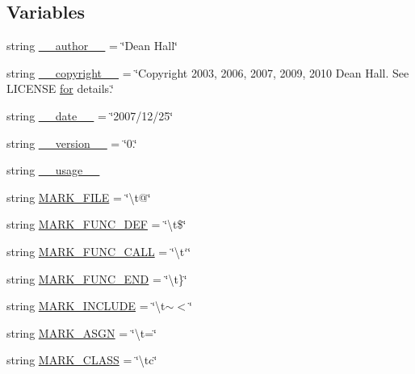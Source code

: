 \subsection*{Variables}
\begin{DoxyCompactItemize}
\item 
string \hyperlink{namespacepycscope_a2298754460411e658bd47ebf789a4cef}{\-\_\-\-\_\-author\-\_\-\-\_\-} = \char`\"{}Dean Hall\char`\"{}
\item 
string \hyperlink{namespacepycscope_aaf595cacaad41fc4a705646cebc1c383}{\-\_\-\-\_\-copyright\-\_\-\-\_\-} = \char`\"{}Copyright 2003, 2006, 2007, 2009, 2010 Dean Hall. See L\-I\-C\-E\-N\-S\-E \hyperlink{group___p_i_o_s___t_i_m_ga354d20ebcb9396fb9b160590fcef9cee}{for} details.\char`\"{}
\item 
string \hyperlink{namespacepycscope_af4accb7da8b3271d0f2ce1d273bbd5de}{\-\_\-\-\_\-date\-\_\-\-\_\-} = \char`\"{}2007/12/25\char`\"{}
\item 
string \hyperlink{namespacepycscope_ad671641244ef639a8ba440baead61e63}{\-\_\-\-\_\-version\-\_\-\-\_\-} = \char`\"{}0.\char`\"{}
\item 
string \hyperlink{namespacepycscope_a5935343cfa1b7b3ed6a6662d8e04f4de}{\-\_\-\-\_\-usage\-\_\-\-\_\-}
\item 
string \hyperlink{namespacepycscope_a009264ba488fb81f5c2faf236dc2957e}{M\-A\-R\-K\-\_\-\-F\-I\-L\-E} = \char`\"{}\textbackslash{}t@\char`\"{}
\item 
string \hyperlink{namespacepycscope_a8ff1f31aa6b2351ef03016d3c8691e90}{M\-A\-R\-K\-\_\-\-F\-U\-N\-C\-\_\-\-D\-E\-F} = \char`\"{}\textbackslash{}t\$\char`\"{}
\item 
string \hyperlink{namespacepycscope_a0ebe5a435fd0cdaa563d5be84886462d}{M\-A\-R\-K\-\_\-\-F\-U\-N\-C\-\_\-\-C\-A\-L\-L} = \char`\"{}\textbackslash{}t`\char`\"{}
\item 
string \hyperlink{namespacepycscope_aca9e6d1a164786d3fe1cd678d995c31f}{M\-A\-R\-K\-\_\-\-F\-U\-N\-C\-\_\-\-E\-N\-D} = \char`\"{}\textbackslash{}t\}\char`\"{}
\item 
string \hyperlink{namespacepycscope_a2269ada09ac36e7514d0d1dc7c42bbc3}{M\-A\-R\-K\-\_\-\-I\-N\-C\-L\-U\-D\-E} = \char`\"{}\textbackslash{}t$\sim$$<$\char`\"{}
\item 
string \hyperlink{namespacepycscope_ab29d723a3a1078980f5d06450f679c3f}{M\-A\-R\-K\-\_\-\-A\-S\-G\-N} = \char`\"{}\textbackslash{}t=\char`\"{}
\item 
string \hyperlink{namespacepycscope_a400d0aef5f4e5a6c4573c4951a12eba3}{M\-A\-R\-K\-\_\-\-C\-L\-A\-S\-S} = \char`\"{}\textbackslash{}tc\char`\"{}
$$
\end{DoxyCompactItemize}
